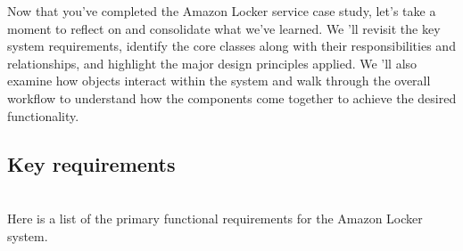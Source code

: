 

Now that you've completed the Amazon Locker service case study, let's take a moment to reflect on and consolidate what we've learned. We 'll revisit the key system requirements, identify the core classes along with their responsibilities and relationships, and highlight the major design principles applied. We
'll also examine how objects interact within the system and walk through the overall workflow to understand how the components come together to achieve the desired functionality.

\subsection{Key requirements}\label{yZtfiqtKpJEGLLknIWleC}
\\
Here is a list of the primary functional requirements for the Amazon Locker system.

